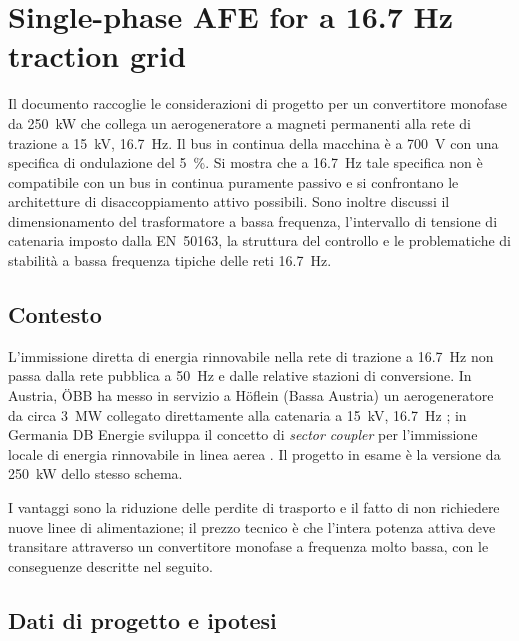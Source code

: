 \chapter{Single-phase AFE for a 16.7 Hz traction grid}
\label{ch:afe167}
\begin{chapabstract}
\noindent
Il documento raccoglie le considerazioni di progetto per un convertitore monofase da
\SI{250}{\kilo\watt} che collega un aerogeneratore a magneti permanenti alla rete di
trazione a \SI{15}{\kilo\volt}, \SI{16.7}{\hertz}. Il bus in continua della macchina è
a \SI{700}{\volt} con una specifica di ondulazione del \SI{5}{\percent}. Si mostra che a
\SI{16.7}{\hertz} tale specifica non è compatibile con un bus in continua puramente
passivo e si confrontano le architetture di disaccoppiamento attivo possibili. Sono
inoltre discussi il dimensionamento del trasformatore a bassa frequenza, l'intervallo
di tensione di catenaria imposto dalla EN~50163, la struttura del controllo e le
problematiche di stabilità a bassa frequenza tipiche delle reti \SI{16.7}{\hertz}.
\end{chapabstract}

\section{Contesto}

L'immissione diretta di energia rinnovabile nella rete di trazione a \SI{16.7}{\hertz}
non passa dalla rete pubblica a \SI{50}{\hertz} e dalle relative stazioni di
conversione. In Austria, ÖBB ha messo in servizio a Höflein (Bassa Austria) un
aerogeneratore da circa \SI{3}{\mega\watt} collegato direttamente alla catenaria a
\SI{15}{\kilo\volt}, \SI{16.7}{\hertz} \cite{oebb_hoeflein}; in Germania DB Energie
sviluppa il concetto di \emph{sector coupler} per l'immissione locale di energia
rinnovabile in linea aerea \cite{db_tuebingen}. Il progetto in esame è la versione da
\SI{250}{\kilo\watt} dello stesso schema.

I vantaggi sono la riduzione delle perdite di trasporto e il fatto di non richiedere
nuove linee di alimentazione; il prezzo tecnico è che l'intera potenza attiva deve
transitare attraverso un convertitore monofase a frequenza molto bassa, con le
conseguenze descritte nel seguito.

\section{Dati di progetto e ipotesi}

